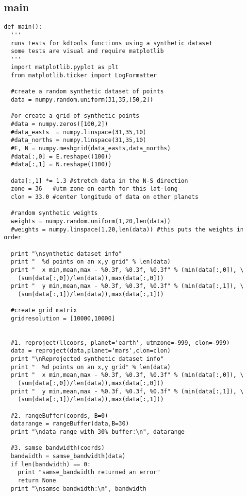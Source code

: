 \documentclass[12pt,letter]{article}
\begin{document}
\subsection{main}
\begin{verbatim}
def main():
  '''
  runs tests for kdtools functions using a synthetic dataset
  some tests are visual and require matplotlib
  '''
  import matplotlib.pyplot as plt
  from matplotlib.ticker import LogFormatter 
  
  #create a random synthetic dataset of points
  data = numpy.random.uniform(31,35,[50,2])
  
  #or create a grid of synthetic points
  #data = numpy.zeros([100,2])
  #data_easts  = numpy.linspace(31,35,10)
  #data_norths = numpy.linspace(31,35,10)
  #E, N = numpy.meshgrid(data_easts,data_norths)
  #data[:,0] = E.reshape((100))
  #data[:,1] = N.reshape((100))
  
  data[:,1] *= 1.3 #stretch data in the N-S direction
  zone = 36   #utm zone on earth for this lat-long
  clon = 33.0 #center longitude of data on other planets
  
  #random synthetic weights
  weights = numpy.random.uniform(1,20,len(data))
  #weights = numpy.linspace(1,20,len(data)) #this puts the weights in order
  
  print "\nsynthetic dataset info"
  print "  %d points on an x,y grid" % len(data)
  print "  x min,mean,max - %0.3f, %0.3f, %0.3f" % (min(data[:,0]), \ 
    (sum(data[:,0])/len(data)),max(data[:,0]))
  print "  y min,mean,max - %0.3f, %0.3f, %0.3f" % (min(data[:,1]), \
    (sum(data[:,1])/len(data)),max(data[:,1]))
  
  #create grid matrix
  gridresolution = [10000,10000]
  
  
  #1. reproject(llcoors, planet='earth', utmzone=-999, clon=-999)
  data = reproject(data,planet='mars',clon=clon)
  print "\nReprojected synthetic dataset info"
  print "  %d points on an x,y grid" % len(data)
  print "  x min,mean,max - %0.3f, %0.3f, %0.3f" % (min(data[:,0]), \
    (sum(data[:,0])/len(data)),max(data[:,0]))
  print "  y min,mean,max - %0.3f, %0.3f, %0.3f" % (min(data[:,1]), \
    (sum(data[:,1])/len(data)),max(data[:,1]))
  
  #2. rangeBuffer(coords, B=0)
  datarange = rangeBuffer(data,B=30)
  print "\ndata range with 30% buffer:\n", datarange
  
  #3. samse_bandwidth(coords)
  bandwidth = samse_bandwidth(data)
  if len(bandwidth) == 0:
    print "samse_bandwidth returned an error"
    return None
  print "\nsamse bandwidth:\n", bandwidth
  


\end{verbatim}
\end{document}
